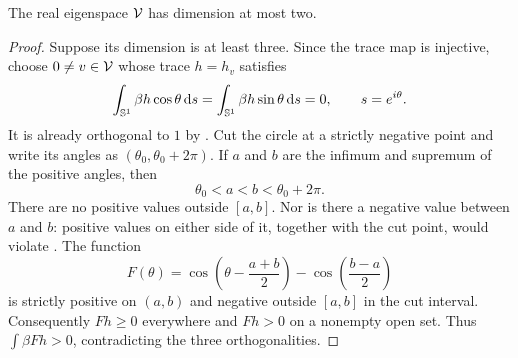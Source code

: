 \begin{proposition}\label{prop:multiplicity}
The real eigenspace $\mathcal V$ has dimension at most two.
\end{proposition}
\begin{proof}
Suppose its dimension is at least three. Since the trace map is injective, choose $0\ne v\in\mathcal V$ whose trace $h=h_v$ satisfies
\[
\int_{\mathbb S^1}\beta h\cos\theta\,\mathrm d s
=\int_{\mathbb S^1}\beta h\sin\theta\,\mathrm d s=0,
\qquad s=e^{i\theta}.
\]
It is already orthogonal to $1$ by . Cut the circle at a strictly negative point and write its angles as $(\theta_0,\theta_0+2\pi)$. If $a$ and $b$ are the infimum and supremum of the positive angles, then
\[
\theta_0<a<b<\theta_0+2\pi.
\]
There are no positive values outside $[a,b]$. Nor is there a negative value between $a$ and $b$: positive values on either side of it, together with the cut point, would violate . The function
\[
F(\theta)=\cos\!\left(\theta-\frac{a+b}{2}\right)
-\cos\!\left(\frac{b-a}{2}\right)
\]
is strictly positive on $(a,b)$ and negative outside $[a,b]$ in the cut interval. Consequently $Fh\ge0$ everywhere and $Fh>0$ on a nonempty open set. Thus $\int\beta Fh>0$, contradicting the three orthogonalities.
\end{proof}
